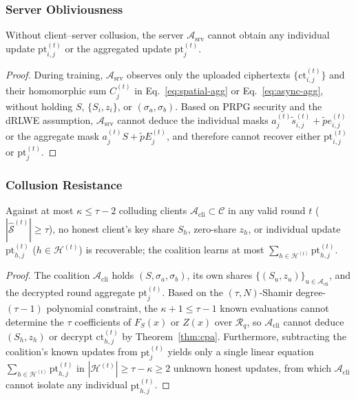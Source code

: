 \subsubsection{Server Obliviousness}
\begin{theorem}
\label{thm:server}
Without client--server collusion, the server $\mathcal{A}_{\mathrm{srv}}$ cannot obtain any individual update $\mathrm{pt}_{i,j}^{(t)}$ or the aggregated update $\mathrm{pt}_j^{(t)}$.
\end{theorem}
\begin{proof}
During training, $\mathcal{A}_{\mathrm{srv}}$ observes only the uploaded ciphertexts $\{\mathrm{ct}_{i,j}^{(t)}\}$ and their homomorphic sum $C_j^{(t)}$ in Eq.~\eqref{eq:spatial-agg} or Eq.~\eqref{eq:async-agg}, without holding $S$, $\{S_i, z_i\}$, or $(\sigma_a, \sigma_b)$. Based on PRPG security and the dRLWE assumption, $\mathcal{A}_{\mathrm{srv}}$ cannot deduce the individual masks $a_j^{(t)}\tilde{s}_{i,j}^{(t)} + \tilde{p}e_{i,j}^{(t)}$ or the aggregate mask $a_j^{(t)}S + \tilde{p}E_j^{(t)}$, and therefore cannot recover either $\mathrm{pt}_{i,j}^{(t)}$ or $\mathrm{pt}_j^{(t)}$.
\end{proof}

\subsubsection{Collusion Resistance}
\begin{theorem}
\label{thm:collusion}
Against at most $\kappa \le \tau - 2$ colluding clients $\mathcal{A}_{\mathrm{cli}} \subset \mathcal{C}$ in any valid round $t$ ($|\widehat{\mathcal{S}}^{(t)}| \ge \tau$), no honest client's key share $S_h$, zero-share $z_h$, or individual update $\mathrm{pt}_{h,j}^{(t)}$ ($h \in \mathcal{H}^{(t)}$) is recoverable; the coalition learns at most $\sum_{h \in \mathcal{H}^{(t)}} \mathrm{pt}_{h,j}^{(t)}$.
\end{theorem}
\begin{proof}
The coalition $\mathcal{A}_{\mathrm{cli}}$ holds $(S, \sigma_a, \sigma_b)$, its own shares $\{(S_u, z_u)\}_{u \in \mathcal{A}_{\mathrm{cli}}}$, and the decrypted round aggregate $\mathrm{pt}_j^{(t)}$. Based on the $(\tau, N)$-Shamir degree-$(\tau-1)$ polynomial constraint, the $\kappa + 1 \le \tau - 1$ known evaluations cannot determine the $\tau$ coefficients of $F_S(x)$ or $Z(x)$ over $\mathcal{R}_q$, so $\mathcal{A}_{\mathrm{cli}}$ cannot deduce $(S_h, z_h)$ or decrypt $\mathrm{ct}_{h,j}^{(t)}$ by Theorem~\ref{thm:cpa}. Furthermore, subtracting the coalition's known updates from $\mathrm{pt}_j^{(t)}$ yields only a single linear equation $\sum_{h \in \mathcal{H}^{(t)}} \mathrm{pt}_{h,j}^{(t)}$ in $|\mathcal{H}^{(t)}| \ge \tau - \kappa \ge 2$ unknown honest updates, from which $\mathcal{A}_{\mathrm{cli}}$ cannot isolate any individual $\mathrm{pt}_{h,j}^{(t)}$.
\end{proof}

